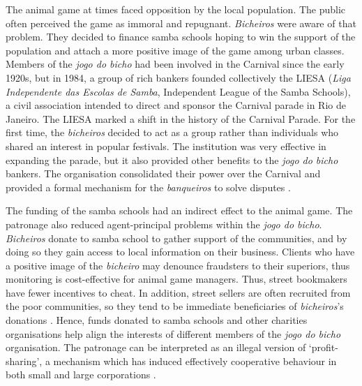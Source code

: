 \documentclass[a4paper,12pt]{article}
\begin{document}
The animal game at times faced opposition by the local population. The public often perceived the game as immoral and repugnant. \emph{Bicheiros} were aware of that problem. They decided to finance samba schools hoping to win the support of the population and attach a more positive image of the game among urban classes. Members of the \emph{jogo do bicho} had been involved in the Carnival since the early 1920s, but in 1984, a group of rich bankers founded collectively the LIESA (\emph{Liga Independente das Escolas de Samba}, Independent League of the Samba Schools), a civil association intended to direct and sponsor the Carnival parade in Rio de Janeiro. The LIESA marked a shift in the history of the Carnival Parade. For the first time, the \emph{bicheiros} decided to act as a group rather than individuals who shared an interest in popular festivals. The institution was very effective in expanding the parade, but it also provided other benefits to the \textit{jogo do bicho} bankers. The organisation consolidated their power over the Carnival and provided a formal mechanism for the \textit{banqueiros} to solve disputes \citetext{\citealp[43]{cavalcanti2006carnaval}; \citealp[171]{farias2013carnival}; \citealp[55]{labronici2012paratodos}}.

The funding of the samba schools had an indirect effect to the animal game. The patronage also reduced agent-principal problems within the \emph{jogo do bicho}. \emph{Bicheiros} donate to samba school to gather support of the communities, and by doing so they gain access to local information on their business. Clients who have a positive image of the \emph{bicheiro} may denounce fraudsters to their superiors, thus monitoring is cost-effective for animal game managers. Thus, street bookmakers have fewer incentives to cheat. In addition, street sellers are often recruited from the poor communities, so they tend to be immediate beneficiaries of \emph{bicheiros}'s donations \citep{bbc2012aniz}. Hence, funds donated to samba schools and other charities organisations help align the interests of different members of the \emph{jogo do bicho} organisation. The patronage can be interpreted as an illegal version of `profit-sharing', a mechanism which has induced effectively cooperative behaviour in both small and large corporations \citep{cahuc1997profit,fitzroy1987cooperation, kruse1992profit}.
\end{document}

